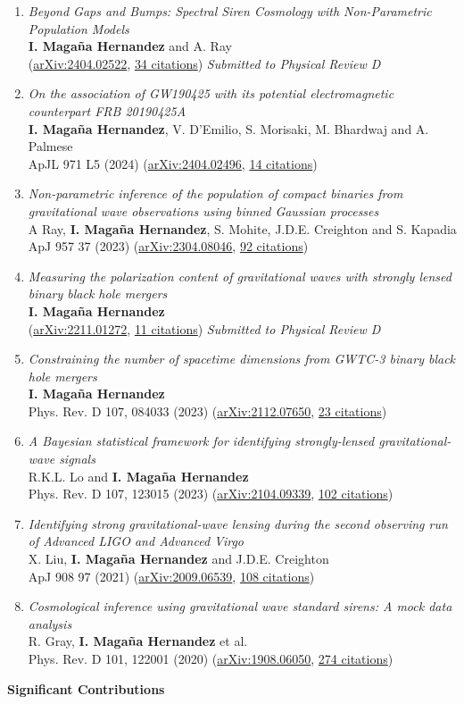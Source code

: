 \documentclass[letterpaper,10pt]{article}
\newcommand{\resheadingAuthor}[1]{{\large \colorbox{mygrey}{\begin{minipage}{\dimexpr\textwidth-2\fboxsep\relax}{\textbf{#1 \vphantom{p\^{E}}}}\end{minipage}}}\vspace{7pt}}
\newcommand{\publicationJournal}[6]{%
\emph{#1}\\
#2\\
#3 (\href{#4}{#5}, \underline{#6 citations})}
\newcommand{\publicationJournalComment}[7]{%
\emph{#1}\\
#2\\
#3 (\href{#4}{#5}, \underline{#6 citations}) \emph{Submitted to #7}}
\begin{document}
\begin{enumerate}
\item 
    \publicationJournalComment{Beyond Gaps and Bumps: Spectral Siren Cosmology with Non-Parametric Population Models}{\textbf{I. Maga\~na Hernandez} and A. Ray}{}{https://arxiv.org/abs/2404.02522}{arXiv:2404.02522}{34}{Physical Review D}
\item 
    \publicationJournal{On the association of GW190425 with its potential electromagnetic counterpart FRB 20190425A}{\textbf{I. Maga\~na Hernandez}, V. D'Emilio, S. Morisaki, M. Bhardwaj and A. Palmese}{ApJL 971 L5 (2024)}{https://arxiv.org/abs/2404.02496}{arXiv:2404.02496}{14}
\item 
    \publicationJournal{Non-parametric inference of the population of compact binaries from gravitational wave observations using binned Gaussian processes}{A Ray, \textbf{I. Maga\~na Hernandez}, S. Mohite, J.D.E. Creighton and S. Kapadia}{ApJ 957 37 (2023)}{https://arxiv.org/abs/2304.08046}{arXiv:2304.08046}{92}
\item 
    \publicationJournalComment{Measuring the polarization content of gravitational waves with strongly lensed binary black hole mergers}{\textbf{I. Maga\~na Hernandez}}{}{https://arxiv.org/abs/2211.01272}{arXiv:2211.01272}{11}{Physical Review D}
\item 
    \publicationJournal{Constraining the number of spacetime dimensions from GWTC-3 binary black hole mergers}{\textbf{I. Maga\~na Hernandez}}{Phys. Rev. D 107, 084033 (2023)}{https://arxiv.org/abs/2112.07650}{arXiv:2112.07650}{23}
\item 
    \publicationJournal{A Bayesian statistical framework for identifying strongly-lensed gravitational-wave signals}{R.K.L. Lo and \textbf{I. Maga\~na Hernandez}}{Phys. Rev. D 107, 123015 (2023)}{https://arxiv.org/abs/2104.09339}{arXiv:2104.09339}{102}
\item
    \publicationJournal{Identifying strong gravitational-wave lensing during the second observing run of Advanced LIGO and Advanced Virgo}{X. Liu, \textbf{I. Maga\~na Hernandez} and J.D.E. Creighton}{ApJ 908 97 (2021)}{https://arxiv.org/abs/2009.06539}{arXiv:2009.06539}{108}
\item
    \publicationJournal{Cosmological inference using gravitational wave standard sirens: A mock data analysis}{R. Gray, \textbf{I. Maga\~na Hernandez} et al.}{Phys. Rev. D 101, 122001 (2020)}{https://arxiv.org/abs/1908.06050}{arXiv:1908.06050}{274}
\end{enumerate}

\resheadingAuthor{Significant Contributions}
\end{document}
